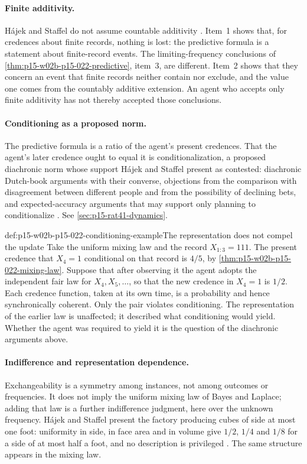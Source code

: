 \paragraph{Finite additivity.}
H\'ajek and Staffel do not assume countable additivity
\cite[p.~248, n.~3]{HajekStaffel2021Dynamics}. Item~1 shows that, for
credences about finite records, nothing is lost: the predictive formula is
a statement about finite-record events. The limiting-frequency conclusions
of \cref{thm:p15-w02b-p15-022-predictive}, item~3, are different. Item~2
shows that they concern an event that finite records neither contain nor
exclude, and the value one comes from the countably additive extension. An
agent who accepts only finite additivity has not thereby accepted those
conclusions.

\paragraph{Conditioning as a proposed norm.}
The predictive formula is a ratio of the agent's present credences. That the
agent's later credence ought to equal it is conditionalization, a proposed
diachronic norm whose support H\'ajek and Staffel present as contested:
diachronic Dutch-book arguments with their converse, objections from the
comparison with disagreement between different people and from the
possibility of declining bets, and expected-accuracy arguments that may
support only planning to conditionalize \cite[p.~244]{HajekStaffel2021Dynamics}.
See \cref{sec:p15-rat41-dynamics}.

\begin{hbexample}{def:p15-w02b-p15-022-conditioning-example}{The representation does not compel the update}
Take the uniform mixing law and the record \(X_{1:3}=111\). The present
credence that \(X_4=1\) conditional on that record is \(4/5\), by
\cref{thm:p15-w02b-p15-022-mixing-law}. Suppose that after observing it the
agent adopts the independent fair law for \(X_4,X_5,\ldots\), so that the
new credence in \(X_4=1\) is \(1/2\). Each credence function, taken at its
own time, is a probability and hence synchronically coherent. Only the pair
violates conditioning. The representation of the earlier law is unaffected;
it described what conditioning would yield. Whether the agent was required
to yield it is the question of the diachronic arguments above.
\end{hbexample}

\paragraph{Indifference and representation dependence.}
Exchangeability is a symmetry among instances, not among outcomes or
frequencies. It does not imply the uniform mixing law of Bayes and Laplace;
adding that law is a further indifference judgment, here over the unknown
frequency. H\'ajek and Staffel present the factory producing cubes of side
at most one foot: uniformity in side, in face area and in volume give
\(1/2\), \(1/4\) and \(1/8\) for a side of at most half a foot, and no
description is privileged \cite[pp.~243--244]{HajekStaffel2021Dynamics}.
The same structure appears in the mixing law.

